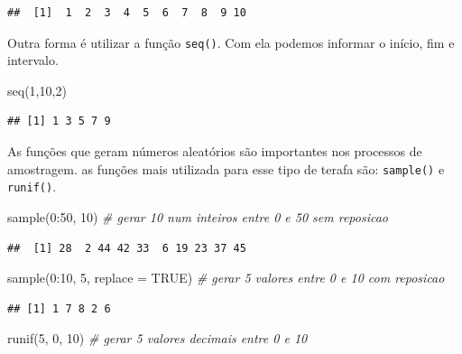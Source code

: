 \documentclass[
]{book}
\newenvironment{Shaded}{\begin{snugshade}}{\end{snugshade}}
\newcommand{\AttributeTok}[1]{\textcolor[rgb]{0.77,0.63,0.00}{#1}}
\newcommand{\CommentTok}[1]{\textcolor[rgb]{0.56,0.35,0.01}{\textit{#1}}}
\newcommand{\ConstantTok}[1]{\textcolor[rgb]{0.00,0.00,0.00}{#1}}
\newcommand{\DecValTok}[1]{\textcolor[rgb]{0.00,0.00,0.81}{#1}}
\newcommand{\FunctionTok}[1]{\textcolor[rgb]{0.00,0.00,0.00}{#1}}
\newcommand{\NormalTok}[1]{#1}
\newcommand{\SpecialCharTok}[1]{\textcolor[rgb]{0.00,0.00,0.00}{#1}}
\begin{document}
\begin{verbatim}
##  [1]  1  2  3  4  5  6  7  8  9 10
\end{verbatim}

Outra forma é utilizar a função \texttt{seq()}. Com ela podemos informar o início, fim e intervalo.

\begin{Shaded}
\begin{Highlighting}[]
\FunctionTok{seq}\NormalTok{(}\DecValTok{1}\NormalTok{,}\DecValTok{10}\NormalTok{,}\DecValTok{2}\NormalTok{)}
\end{Highlighting}
\end{Shaded}

\begin{verbatim}
## [1] 1 3 5 7 9
\end{verbatim}

As funções que geram números aleatórios são importantes nos processos de amostragem. as funções mais utilizada para esse tipo de terafa são: \texttt{sample()} e \texttt{runif()}.

\begin{Shaded}
\begin{Highlighting}[]
\FunctionTok{sample}\NormalTok{(}\DecValTok{0}\SpecialCharTok{:}\DecValTok{50}\NormalTok{, }\DecValTok{10}\NormalTok{) }\CommentTok{\# gerar 10 num inteiros entre 0 e 50 sem reposicao}
\end{Highlighting}
\end{Shaded}

\begin{verbatim}
##  [1] 28  2 44 42 33  6 19 23 37 45
\end{verbatim}

\begin{Shaded}
\begin{Highlighting}[]
\FunctionTok{sample}\NormalTok{(}\DecValTok{0}\SpecialCharTok{:}\DecValTok{10}\NormalTok{, }\DecValTok{5}\NormalTok{, }\AttributeTok{replace =} \ConstantTok{TRUE}\NormalTok{) }\CommentTok{\# gerar 5 valores entre 0 e 10 com reposicao}
\end{Highlighting}
\end{Shaded}

\begin{verbatim}
## [1] 1 7 8 2 6
\end{verbatim}

\begin{Shaded}
\begin{Highlighting}[]
\FunctionTok{runif}\NormalTok{(}\DecValTok{5}\NormalTok{, }\DecValTok{0}\NormalTok{, }\DecValTok{10}\NormalTok{) }\CommentTok{\# gerar 5 valores decimais entre 0 e 10}
\end{Highlighting}
\end{Shaded}
\end{document}
